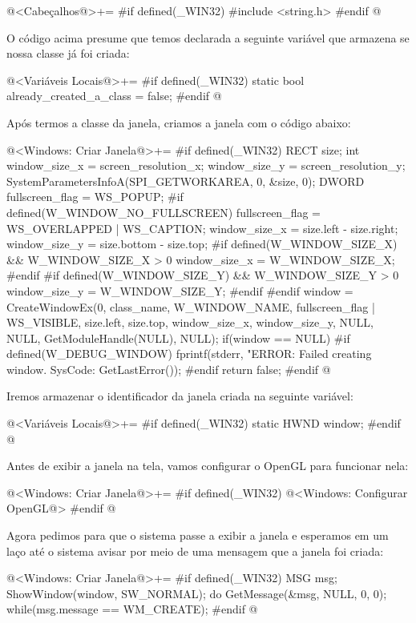 \iniciocodigo
@<Cabeçalhos@>+=
#if defined(_WIN32)
#include <string.h>
#endif
@
\fimcodigo

O código acima presume que temos declarada a seguinte variável que
armazena se nossa classe já foi criada:

\iniciocodigo
@<Variáveis Locais@>+=
#if defined(_WIN32)
static bool already_created_a_class = false;
#endif
@
\fimcodigo

Após termos a classe da janela, criamos a janela com o código
abaixo:

\iniciocodigo
@<Windows: Criar Janela@>+=
#if defined(_WIN32)
{
  RECT size;
  int window_size_x = screen_resolution_x;
  window_size_y = screen_resolution_y;
  SystemParametersInfoA(SPI_GETWORKAREA, 0, &size, 0);
  DWORD fullscreen_flag = WS_POPUP;
#if defined(W_WINDOW_NO_FULLSCREEN)
  fullscreen_flag = WS_OVERLAPPED | WS_CAPTION;
  window_size_x = size.left - size.right;
  window_size_y = size.bottom - size.top;
#if defined(W_WINDOW_SIZE_X) && W_WINDOW_SIZE_X > 0
  window_size_x = W_WINDOW_SIZE_X;
#endif
#if defined(W_WINDOW_SIZE_Y) && W_WINDOW_SIZE_Y > 0
  window_size_y = W_WINDOW_SIZE_Y;
#endif
#endif
  window = CreateWindowEx(0, class_name,
                          W_WINDOW_NAME,
                          fullscreen_flag | WS_VISIBLE,
                          size.left, size.top, window_size_x,
                          window_size_y,
                          NULL, NULL,
                          GetModuleHandle(NULL),
                          NULL);
  if(window == NULL){
#if defined(W_DEBUG_WINDOW)
    fprintf(stderr, "ERROR: Failed creating window. SysCode: %
            GetLastError());
#endif
    return false;
  }
}
#endif
@
\fimcodigo

Iremos armazenar o identificador da janela criada na seguinte
variável:

\iniciocodigo
@<Variáveis Locais@>+=
#if defined(_WIN32)
static HWND window;
#endif
@
\fimcodigo

Antes de exibir a janela na tela, vamos configurar o OpenGL para
funcionar nela:

\iniciocodigo
@<Windows: Criar Janela@>+=
#if defined(_WIN32)
@<Windows: Configurar OpenGL@>
#endif
@
\fimcodigo

Agora pedimos para que o sistema passe a exibir a janela e esperamos
em um laço até o sistema avisar por meio de uma mensagem que a janela
foi criada:

\iniciocodigo
@<Windows: Criar Janela@>+=
#if defined(_WIN32)
{
  MSG msg;
  ShowWindow(window, SW_NORMAL);
  do{
    GetMessage(&msg, NULL, 0, 0);
  } while(msg.message == WM_CREATE);
}
#endif
@
\fimcodigo

